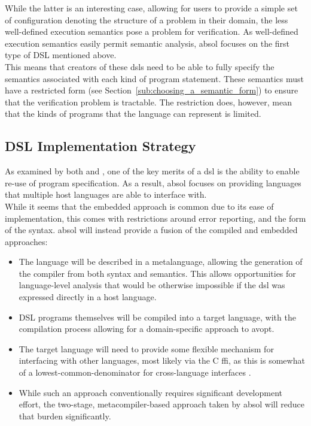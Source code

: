 While the latter is an interesting case, allowing for users to provide a simple set of configuration denoting the structure of a problem in their domain, the less well-defined execution semantics pose a problem for verification.
As well-defined execution semantics easily permit semantic analysis, \gls{absol} focuses on the first type of DSL mentioned above.\\

This means that creators of these \glspl{dsl} need to be able to fully specify the semantics associated with each kind of program statement. 
These semantics must have a restricted form (see Section~\ref{sub:choosing_a_semantic_form}) to ensure that the verification problem is tractable.  
The restriction does, however, mean that the kinds of programs that the language can represent is limited.


\subsection{DSL Implementation Strategy} %
\label{sub:dsl_implementation_strategy}
As examined by both \citet{Mernik:2005:DDL:1118890.1118892} and \citet{van2000domain}, one of the key merits of a \gls{dsl} is the ability to enable re-use of program specification. 
As a result, \gls{absol} focuses on providing languages that multiple host languages are able to interface with. \\

While it seems that the embedded approach is common due to its ease of implementation, this comes with restrictions around error reporting, and the form of the syntax. 
\gls{absol} will instead provide a fusion of the compiled and embedded approaches:
\begin{itemize}
    \item The language will be described in a metalanguage, allowing the generation of the compiler from both syntax and semantics.
    This allows opportunities for language-level analysis that would be otherwise impossible if the \gls{dsl} was expressed directly in a host language.
    \item DSL programs themselves will be compiled into a target language, with the compilation process allowing for a domain-specific approach to \gls{avopt}.
    \item The target language will need to provide some flexible mechanism for interfacing with other languages, most likely via the C \gls{ffi}, as this is somewhat of a lowest-common-denominator for cross-language interfaces \citep{van2001asf+}.
    \item While such an approach conventionally requires significant development effort, the two-stage, metacompiler-based approach taken by \gls{absol} will reduce that burden significantly.
\end{itemize}

